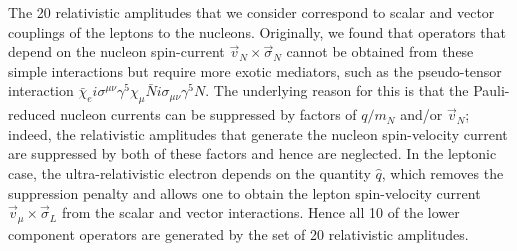\documentclass[12pt,letterpaper]{book}
\begin{document}
The 20 relativistic amplitudes that we consider correspond to scalar and vector couplings of the leptons to the nucleons.  Originally, we found that operators that depend on the nucleon spin-current $\vec{v}_N\times\vec{\sigma}_N$ cannot be obtained from these simple interactions but require more exotic mediators, such as the pseudo-tensor interaction $\bar{\chi}_ei\sigma^{\mu\nu}\gamma^5\chi_{\mu}\bar{N}i\sigma_{\mu\nu}\gamma^5 N$. The underlying reason for this is that the Pauli-reduced nucleon currents can be suppressed by factors of $q/m_N$ and/or $\vec{v}_N$; indeed, the relativistic amplitudes that generate the nucleon spin-velocity current are suppressed by both of these factors and hence are neglected. In the leptonic case, the ultra-relativistic electron depends on the quantity $\hat{q}$, which removes the suppression penalty and allows one to obtain the lepton spin-velocity current $\vec{v}_{\mu}\times\vec{\sigma}_L$ from the scalar and vector interactions. Hence all 10 of the lower component operators are generated by the set of 20 relativistic amplitudes.
\end{document}
